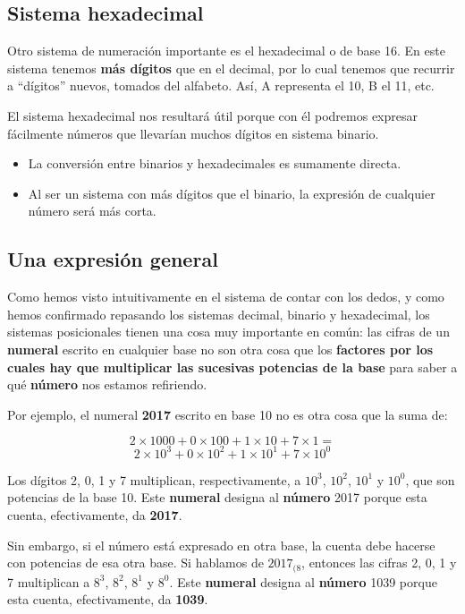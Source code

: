 \documentclass[spanish,A4,]{article}
\begin{document}
\subsection{Sistema hexadecimal}\label{sistema-hexadecimal}

Otro sistema de numeración importante es el hexadecimal o de base 16. En
este sistema tenemos \textbf{más dígitos} que en el decimal, por lo cual
tenemos que recurrir a ``dígitos'' nuevos, tomados del alfabeto. Así, A
representa el 10, B el 11, etc.

El sistema hexadecimal nos resultará útil porque con él podremos
expresar fácilmente números que llevarían muchos dígitos en sistema
binario.

\begin{itemize}
\itemsep1pt\parskip0pt
\item
  La conversión entre binarios y hexadecimales es sumamente directa.
\item
  Al ser un sistema con más dígitos que el binario, la expresión de
  cualquier número será más corta.
\end{itemize}

\subsection{Una expresión general}\label{una-expresiuxf3n-general}

Como hemos visto intuitivamente en el sistema de contar con los dedos, y
como hemos confirmado repasando los sistemas decimal, binario y
hexadecimal, los sistemas posicionales tienen una cosa muy importante en
común: las cifras de un \textbf{numeral} escrito en cualquier base no
son otra cosa que los \textbf{factores por los cuales hay que
multiplicar las sucesivas potencias de la base} para saber a qué
\textbf{número} nos estamos refiriendo.

Por ejemplo, el numeral \textbf{2017} escrito en base 10 no es otra cosa
que la suma de:

\[2 \times 1000 + 0 \times 100 + 1 \times 10 + 7 \times 1 = \]
\[2 \times 10^3 + 0 \times 10^2 + 1 \times 10^1 + 7 \times 10^0\]

Los dígitos 2, 0, 1 y 7 multiplican, respectivamente, a $10^3$, $10^2$,
$10^1$ y $10^0$, que son potencias de la base 10. Este \textbf{numeral}
designa al \textbf{número} 2017 porque esta cuenta, efectivamente, da
\textbf{2017}.

Sin embargo, si el número está expresado en otra base, la cuenta debe
hacerse con potencias de esa otra base. Si hablamos de $2017_{(8}$,
entonces las cifras 2, 0, 1 y 7 multiplican a $8^3$, $8^2$, $8^1$ y
$8^0$. Este \textbf{numeral} designa al \textbf{número} 1039 porque esta
cuenta, efectivamente, da \textbf{1039}.
\end{document}
